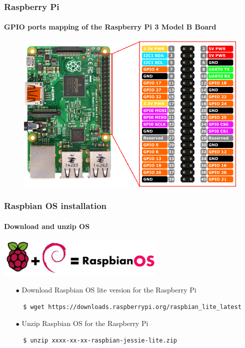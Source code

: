 \documentclass{beamer}
\begin{document}

\begin{frame}
\frametitle{\textbf{Raspberry Pi}}
\framesubtitle{\textbf{GPIO ports mapping of the Raspberry Pi 3 Model B Board}}
\begin{figure}
\centering
\includegraphics[scale=1]{imgs/gpio.png}
\end{figure}
\end{frame}


\begin{frame}[fragile]
\frametitle{\textbf{Raspbian OS installation}}
\framesubtitle{\textbf{Download and unzip OS}}

\begin{center}
\includegraphics[width=0.60\textwidth]{imgs/raspbian_logo.jpg}
\end{center}
\begin{itemize}
\item[$\bullet$] Download Raspbian OS lite version for the Raspberry Pi
\begin{lstlisting}
  $ wget https://downloads.raspberrypi.org/raspbian_lite_latest
\end{lstlisting}
\item[$\bullet$] Unzip Raspbian OS for the Raspberry Pi
\begin{lstlisting}
  $ unzip xxxx-xx-xx-raspbian-jessie-lite.zip
\end{lstlisting}
\end{itemize}

\end{frame}
\end{document}
